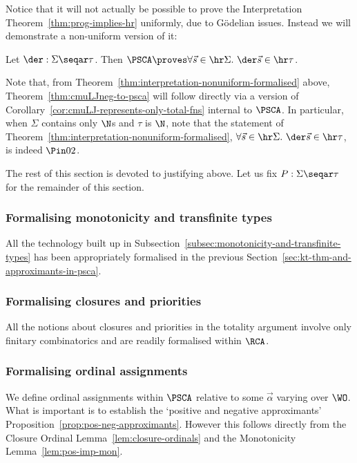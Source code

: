 Notice that it will not actually be possible to prove the Interpretation Theorem~\ref{thm:prog-implies-hr} uniformly, due to G\"odelian issues.
Instead we will demonstrate a non-uniform version of it:
\begin{theorem}
    \label{thm:interpretation-nonuniform-formalised}
    Let $\der:\Sigma \seqar \tau$.  
    Then
    $\PSCA \proves \forall \vec s \in \hr\Sigma .\  \der \vec s \in \hr \tau $.
\end{theorem}


Note that, from Theorem~\ref{thm:interpretation-nonuniform-formalised} above, Theorem~\ref{thm:cmuLJneg-to-psca} will follow directly via a version of Corollary~\ref{cor:cmuLJ-represents-only-total-fns} internal to $\PSCA$.
In particular, when $\Sigma$ contains only $\N$s and $\tau$ is $\N$, note that the statement of Theorem~\ref{thm:interpretation-nonuniform-formalised}, $\forall \vec s \in \hr\Sigma .\  \der \vec s \in \hr \tau $, is indeed $\Pin 0 2$.

The rest of this section is devoted to justifying  above.
Let us fix $P:\Sigma \seqar \tau$ for the remainder of this section.


\subsubsection*{Formalising monotonicity and transfinite types}
All the technology built up in Subsection~\ref{subsec:monotonicity-and-transfinite-types} has been appropriately formalised in the previous Section~\ref{sec:kt-thm-and-approximants-in-psca}.

\subsubsection*{Formalising closures and priorities}
All the notions about closures and priorities in the totality argument involve only finitary combinatorics and are readily formalised within $\RCA$.

\subsubsection*{Formalising ordinal assignments}
We define ordinal assignments within $\PSCA$ relative to some $\vec \alpha$ varying over $\WO$. 
% 
What is important is to establish the `positive and negative approximants' Proposition~\ref{prop:pos-neg-approximants}. 
However this follows directly from the Closure Ordinal Lemma~\ref{lem:closure-ordinals} and the Monotonicity Lemma~\ref{lem:pos-imp-mon}.

